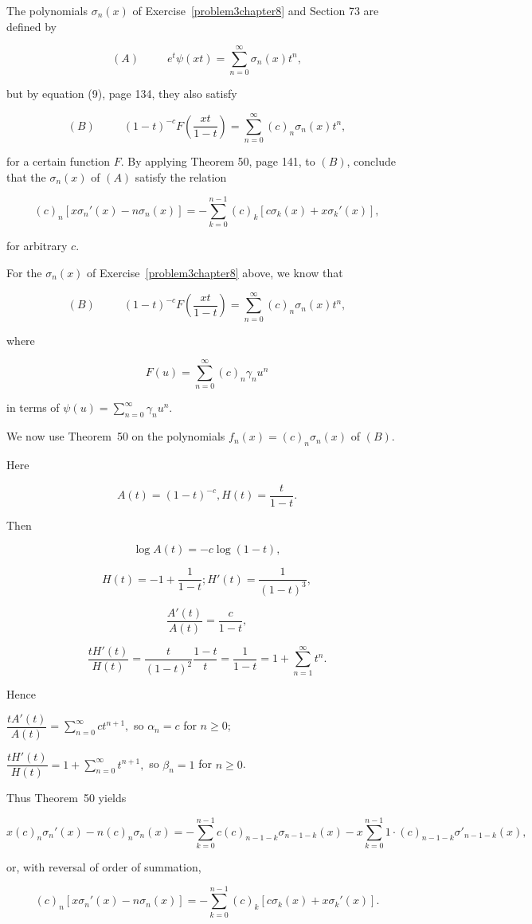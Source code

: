 \begin{problem}\label{problem4chapter8}
The polynomials $\sigma_n(x)$ of Exercise~\ref{problem3chapter8} and Section 73 are defined by 

$$(A) \hspace{30pt} e^t \psi(xt) = \displaystyle\sum_{n=0}^{\infty} \sigma_n(x) t^n,$$

but by equation (9), page 134, they  also satisfy

$$(B) \hspace{30pt} (1-t)^{-c} F \left( \dfrac{xt}{1-t} \right) = \displaystyle\sum_{n=0}^{\infty} (c)_n \sigma_n(x) t^n,$$

for a certain function $F$. By applying Theorem 50, page 141, to $(B)$, conclude that the $\sigma_n(x)$ of $(A)$ satisfy the relation

$$(c)_n[x \sigma_n'(x) - n \sigma_n(x)] = - \displaystyle\sum_{k=0}^{n-1} (c)_k [c \sigma_k(x) + x \sigma_k'(x)],$$

for arbitrary $c$.
\end{problem}
\begin{solution}
For the $\sigma_n(x)$ of Exercise~\ref{problem3chapter8} above, we know that

$$(B) \hspace{30pt} (1-t)^{-c} F \left( \dfrac{xt}{1-t} \right) = \displaystyle\sum_{n=0}^{\infty} (c)_n \sigma_n(x) t^n,$$

where

$$F(u) = \displaystyle\sum_{n=0}^{\infty} (c)_n \gamma_n u^n$$

in terms of $\psi(u) = \displaystyle\sum_{n=0}^{\infty} \gamma_n u^n.$

We now use Theorem~50 on the polynomials $f_n(x) = (c)_n \sigma_n(x)$ of $(B)$. 

Here

$$A(t) = (1-t)^{-c}, H(t) = \dfrac{t}{1-t}.$$

Then

$$\log A(t) = -c \log(1-t),$$

$$H(t) = -1 + \dfrac{1}{1-t}; H'(t) = \dfrac{1}{(1-t)^3},$$

$$\dfrac{A'(t)}{A(t)} = \dfrac{c}{1-t},$$

$$\dfrac{t H'(t)}{H(t)} = \dfrac{t}{(1-t)^2} \dfrac{1-t}{t} = \dfrac{1}{1-t} = 1 + \displaystyle\sum_{n=1}^{\infty} t^n.$$

Hence

$\dfrac{t A'(t)}{A(t)} = \displaystyle\sum_{n=0}^{\infty} ct^{n+1},$ so $\alpha_n=c$ for $n \geq 0$; 

$\dfrac{t H'(t)}{H(t)} = 1 + \displaystyle\sum_{n=0}^{\infty} t^{n+1},$ so $\beta_n=1$ for $n \geq 0$.

Thus Theorem~50 yields

$$x (c)_{n} \sigma_{n}'(x) - n(c)_n \sigma_n(x) = - \displaystyle\sum_{k=0}^{n-1} c (c)_{n-1-k} \sigma_{n-1-k}(x) - x \displaystyle\sum_{k=0}^{n-1} 1 \cdot (c)_{n-1-k} \sigma'_{n-1-k}(x),$$

or, with reversal of order of summation,

$$(c)_n [x \sigma_n'(x) - n \sigma_n(x)] = - \displaystyle\sum_{k=0}^{n-1} (c)_k [c \sigma_k(x) + x \sigma_k'(x)].$$
\end{solution}
